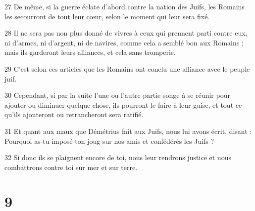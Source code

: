 \par 27 De même, si la guerre éclate d'abord contre la nation des Juifs, les Romains les secourront de tout leur cœur, selon le moment qui leur sera fixé.
\par 28 Il ne sera pas non plus donné de vivres à ceux qui prennent parti contre eux, ni d'armes, ni d'argent, ni de navires, comme cela a semblé bon aux Romains ; mais ils garderont leurs alliances, et cela sans tromperie.
\par 29 C'est selon ces articles que les Romains ont conclu une alliance avec le peuple juif.
\par 30 Cependant, si par la suite l'une ou l'autre partie songe à se réunir pour ajouter ou diminuer quelque chose, ils pourront le faire à leur guise, et tout ce qu'ils ajouteront ou retrancheront sera ratifié.
\par 31 Et quant aux maux que Démétrius fait aux Juifs, nous lui avons écrit, disant : Pourquoi as-tu imposé ton joug sur nos amis et confédérés les Juifs ?
\par 32 Si donc ils se plaignent encore de toi, nous leur rendrons justice et nous combattrons contre toi sur mer et sur terre.

\chapter{9}

